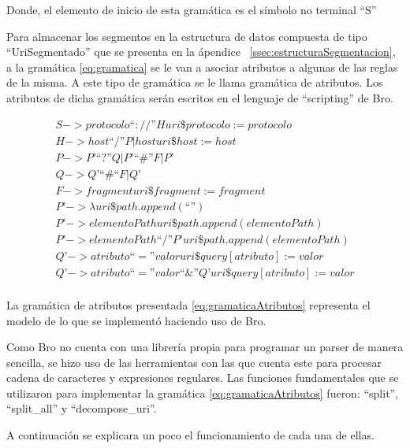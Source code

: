 Donde, el elemento de inicio de esta gramática es el símbolo no terminal ``S''

Para almacenar los segmentos en la estructura de datos compuesta de tipo ``UriSegmentado'' que se presenta en la ápendice ~\ref{ssec:estructuraSegmentacion}, a la gramática \ref{eq:gramatica} se le van a asociar atributos a algunas de las reglas de la misma. A este tipo de gramática se le llama gramática de atributos. Los atributos de dicha gramática serán escritos en el lenguaje de ``scripting'' de Bro.

\begin{equation}\label{eq:gramaticaAtributos}
\begin{aligned}
S -> protocolo “ :// ” H { uri\$protocolo := protocolo } \\
H -> host “/” P | host { uri\$host := host  } \\
P -> P’ “?” Q | P’ “\#” F | P’ \\
Q -> Q’ “\#“ F | Q’ \\
F -> fragment { uri\$fragment := fragment } \\
P’ -> \lambda  { uri\$path.append(“”) } \\
P’ ->  elementoPath { uri\$path.append(elementoPath) } \\
P’ -> elementoPath “/” P’ { uri\$path.append(elementoPath) } \\
Q’ -> atributo “=” valor { uri\$query[atributo] := valor } \\
Q’ -> atributo “=” valor “\&” Q’ { uri\$query[atributo] := valor } \\
\end{aligned}
\end{equation}

    La gramática de atributos presentada \ref{eq:gramaticaAtributos} representa el modelo de lo que se implementó haciendo uso de Bro.

    Como Bro no cuenta con una librería propia para programar un parser de manera sencilla, se hizo uso de las herramientas con las que cuenta este para procesar cadena de caracteres y expresiones regulares. Las funciones fundamentales que se utilizaron para implementar  la gramática \ref{eq:gramaticaAtributos} fueron: ``split'', ``split\_all'' y ``decompose\_uri''.

A continuación se explicara un poco el funcionamiento de cada una de ellas.

